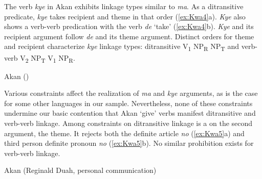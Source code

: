 \documentclass[output=paper,colorlinks,citecolor=brown]{langscibook}
\begin{document}
The verb \textit{kye} in Akan exhibits linkage types similar to \textit{ma}. As a ditransitive predicate, \textit{kye} takes recipient and theme in that order (\ref{ex:Kwa4}a). \textit{Kye} also shows a verb-verb predication with the verb \textit{de} ‘take’ (\ref{ex:Kwa4}b). \textit{Kye} and its recipient argument follow \textit{de} and its theme argument. Distinct orders for theme and recipient characterize \textit{kye} linkage types: ditransitive V\textsubscript{1} NP\textsubscript{R} NP\textsubscript{T} and verb-verb V\textsubscript{2} NP\textsubscript{T} V\textsubscript{1} NP\textsubscript{R}.

\ea \label{ex:Kwa4} Akan (\citealt[23]{Osam2004})
\begin{xlist}
\end{xlist}
\z

Various constraints affect the realization of \textit{ma} and \textit{kye} arguments, as is the case for some other languages in our sample. Nevertheless, none of these constraints undermine our basic contention that Akan ‘give’ verbs manifest ditransitive and verb-verb linkage. Among constraints on ditransitive linkage is a  on the second argument, the theme. It rejects both the definite article \textit{no} (\ref{ex:Kwa5}a) and third person definite pronoun \textit{no} (\ref{ex:Kwa5}b). No similar prohibition exists for verb-verb linkage.\largerpage

\ea \label{ex:Kwa5} Akan (Reginald Duah, personal communication)
\begin{xlist}
\end{xlist}
\z
\end{document}
